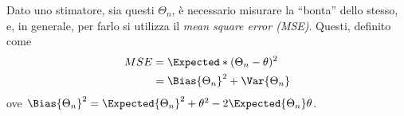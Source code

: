 \documentclass{subfiles}
\begin{document}
Dato uno stimatore, sia questi \(\Theta_{n}\), è necessario misurare la ``bonta'' dello stesso,
e, in generale, per farlo si utilizza il \emph{mean square error (MSE)}.
Questi, definito come
\[\begin{aligned}
        MSE & = \Expected*{(\Theta_{n} - \theta)^{2}}    \\
            & = \Bias{\Theta_{n}}^{2} + \Var{\Theta_{n}} \\
    \end{aligned}\]
ove \(\Bias{\Theta_{n}}^{2} = \Expected{\Theta_{n}}^{2} + \theta^{2} - 2 \Expected{\Theta_{n}}\theta\).
\end{document}
